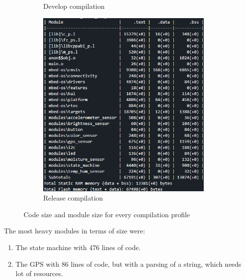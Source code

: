 \begin{figure}[H]
\begin{subfigure}[t]{0.45\textwidth}
        \caption{Develop compilation}
    \end{subfigure}
    \begin{subfigure}[t]{0.45\textwidth}
        \centering
        \includegraphics[width=0.95\textwidth]{images/4/Release.png}
        \caption{Release compilation}
    \end{subfigure}
    \caption{Code size and module size for every compilation profile}
    \label{fig:compilation}
\end{figure}

The most heavy modules in terms of size were:
\begin{enumerate}
    \item The state machine with 476 lines of code.
    \item The GPS with 86 lines of code, but with a parsing of a string, which needs lot of resources.
\end{enumerate}
